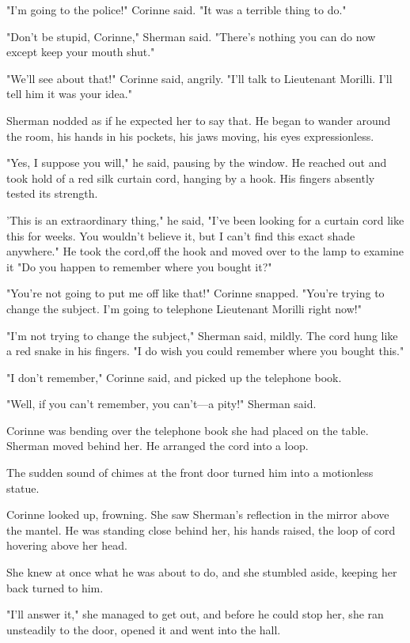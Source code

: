 \documentclass{novel}
\begin{document}
"I'm going to the police!" Corinne said. "It was a terrible thing to do."

"Don't be stupid, Corinne," Sherman said. "There's nothing you can do now except keep your mouth shut."

"We'll see about that!" Corinne said, angrily. "I'll talk to Lieutenant Morilli. I'll tell him it was your idea."

Sherman nodded as if he expected her to say that. He began to wander around the room, his hands in his pockets, his jaws moving, his eyes expressionless.

"Yes, I suppose you will," he said, pausing by the window. He reached out and took hold of a red silk curtain cord, hanging by a hook. His fingers absently tested its strength.

'This is an extraordinary thing," he said, "I've been looking for a curtain cord like this for weeks. You wouldn't believe it, but I can't find this exact shade anywhere." He took the cord,off the hook and moved over to the lamp to examine it "Do you happen to remember where you bought it?"

"You're not going to put me off like that!" Corinne snapped. "You're trying to change the subject. I'm going to telephone Lieutenant Morilli right now!"

"I'm not trying to change the subject," Sherman said, mildly. The cord hung like a red snake in his fingers. "I do wish you could remember where you bought this."

"I don't remember," Corinne said, and picked up the telephone book.

"Well, if you can't remember, you can't—a pity!" Sherman said.

Corinne was bending over the telephone book she had placed on the table. Sherman moved behind her. He arranged the cord into a loop.

The sudden sound of chimes at the front door turned him into a motionless statue.

Corinne looked up, frowning. She saw Sherman's reflection in the mirror above the mantel. He was standing close behind her, his hands raised, the loop of cord hovering above her head.

She knew at once what he was about to do, and she stumbled aside, keeping her back turned to him.

"I'll answer it," she managed to get out, and before he could stop her, she ran unsteadily to the door, opened it and went into the hall.
\end{document}
